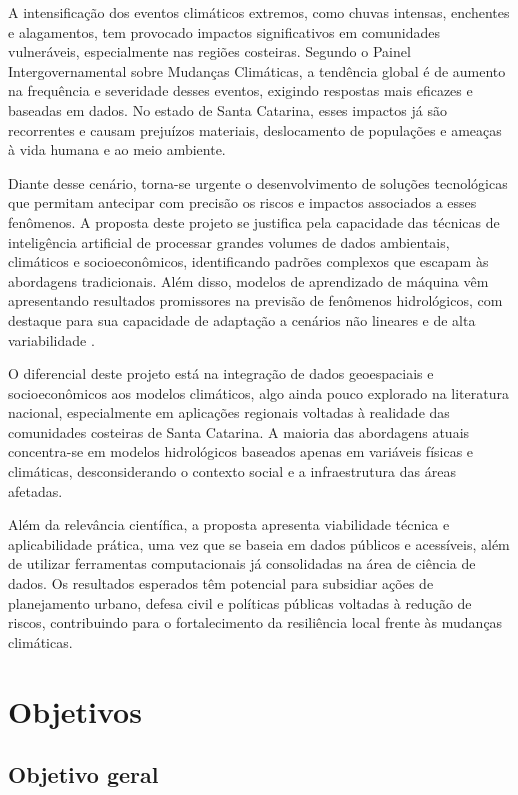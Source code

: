 A intensificação dos eventos climáticos extremos, como chuvas intensas, enchentes e alagamentos, tem provocado impactos significativos em comunidades vulneráveis, especialmente nas regiões costeiras. Segundo o Painel Intergovernamental sobre Mudanças Climáticas, a tendência global é de aumento na frequência e severidade desses eventos, exigindo respostas mais eficazes e baseadas em dados. No estado de Santa Catarina, esses impactos já são recorrentes e causam prejuízos materiais, deslocamento de populações e ameaças à vida humana e ao meio ambiente.

Diante desse cenário, torna-se urgente o desenvolvimento de soluções tecnológicas que permitam antecipar com precisão os riscos e impactos associados a esses fenômenos. A proposta deste projeto se justifica pela capacidade das técnicas de inteligência artificial de processar grandes volumes de dados ambientais, climáticos e socioeconômicos, identificando padrões complexos que escapam às abordagens tradicionais. Além disso, modelos de aprendizado de máquina vêm apresentando resultados promissores na previsão de fenômenos hidrológicos, com destaque para sua capacidade de adaptação a cenários não lineares e de alta variabilidade \cite{mosavi2018,oliveira2013}.

O diferencial deste projeto está na integração de dados geoespaciais e socioeconômicos aos modelos climáticos, algo ainda pouco explorado na literatura nacional, especialmente em aplicações regionais voltadas à realidade das comunidades costeiras de Santa Catarina. A maioria das abordagens atuais concentra-se em modelos hidrológicos baseados apenas em variáveis físicas e climáticas, desconsiderando o contexto social e a infraestrutura das áreas afetadas.

Além da relevância científica, a proposta apresenta viabilidade técnica e aplicabilidade prática, uma vez que se baseia em dados públicos e acessíveis, além de utilizar ferramentas computacionais já consolidadas na área de ciência de dados. Os resultados esperados têm potencial para subsidiar ações de planejamento urbano, defesa civil e políticas públicas voltadas à redução de riscos, contribuindo para o fortalecimento da resiliência local frente às mudanças climáticas.

\section{Objetivos}
\label{sec:objetivos}

\subsection{Objetivo geral}
\label{sec:objetivo-geral}

